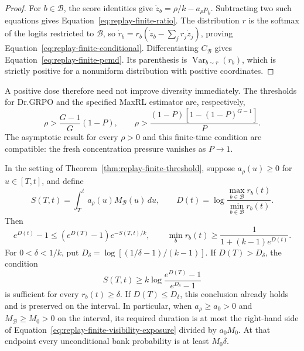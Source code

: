 \begin{proof}
For $b\in\mathcal B$, the score identities give
$\dot z_b=\rho/k-a_\rho p_b$. Subtracting two such equations gives
Equation~\eqref{eq:replay-finite-ratio}. The distribution $r$ is the softmax
of the logits restricted to $\mathcal B$, so
$\dot r_b=r_b(\dot z_b-\sum_jr_j\dot z_j)$, proving
Equation~\eqref{eq:replay-finite-conditional}. Differentiating
$C_{\mathcal B}$ gives Equation~\eqref{eq:replay-finite-pcmd}.
Its parenthesis is $\operatorname{Var}_{b\sim r}(r_b)$, which is strictly
positive for a nonuniform distribution with positive coordinates.
\end{proof}

A positive dose therefore need not improve diversity immediately.
The thresholds for Dr.GRPO and the specified MaxRL estimator are, respectively,
\[
 \rho>\frac{G-1}{G}(1-P),\qquad
 \rho>\frac{(1-P)[1-(1-P)^{G-1}]}{P}.
\]
The asymptotic result for every $\rho>0$ and this finite-time condition are
compatible: the fresh concentration pressure vanishes as $P\to1$.

\begin{theorem}
\label{thm:replay-finite-recovery}
In the setting of Theorem~\ref{thm:replay-finite-threshold}, suppose
$a_\rho(u)\ge0$ for $u\in[T,t]$, and define
\[
 S(T,t)=\int_T^t a_\rho(u)M_{\mathcal B}(u)\,du,
 \qquad D(t)=\log\frac{\max_{b\in\mathcal B}r_b(t)}
                            {\min_{b\in\mathcal B}r_b(t)}.
\]
Then
\begin{equation}
 e^{D(t)}-1\le(e^{D(T)}-1)e^{-S(T,t)/k},
 \qquad
 \min_b r_b(t)\ge\frac{1}{1+(k-1)e^{D(t)}}.
 \label{eq:replay-finite-recovery}
\end{equation}
For $0<\delta<1/k$, put
$D_\delta=\log[(1/\delta-1)/(k-1)]$. If $D(T)>D_\delta$, the condition
\begin{equation}
 S(T,t)\ge k\log\frac{e^{D(T)}-1}{e^{D_\delta}-1}
 \label{eq:replay-finite-visibility-exposure}
\end{equation}
is sufficient for every $r_b(t)\ge\delta$. If $D(T)\le D_\delta$, this
conclusion already holds and is preserved on the interval. In particular,
when $a_\rho\ge a_0>0$ and $M_{\mathcal B}\ge M_0>0$ on the interval,
its required duration is at most the right-hand side of
Equation~\eqref{eq:replay-finite-visibility-exposure} divided by $a_0M_0$.
At that endpoint every unconditional bank probability is at least
$M_0\delta$.
\end{theorem}

